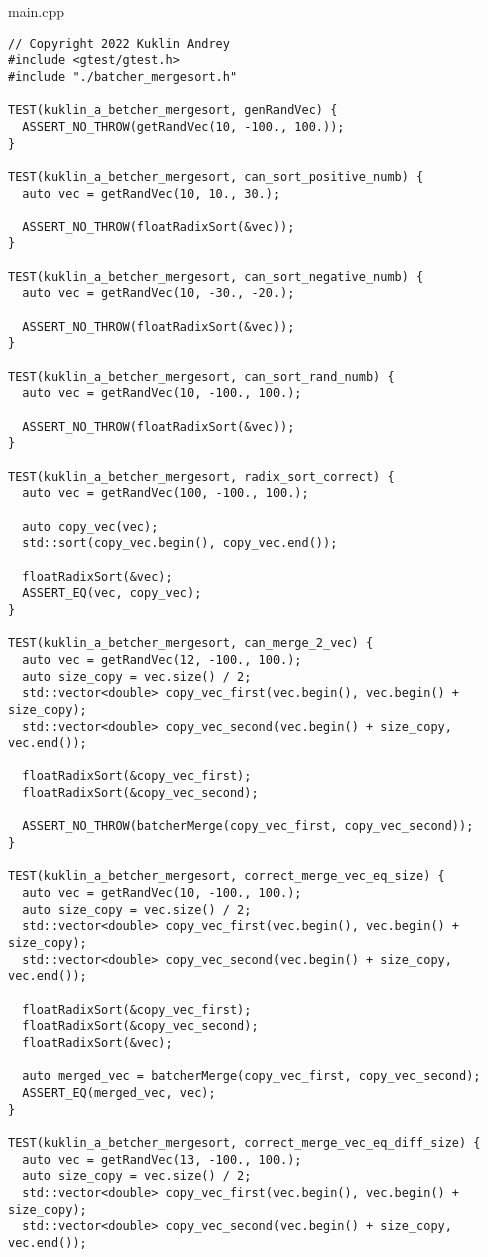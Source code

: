 \documentclass{report}
\begin{document}
\par main.cpp
\begin{lstlisting}
// Copyright 2022 Kuklin Andrey
#include <gtest/gtest.h>
#include "./batcher_mergesort.h"

TEST(kuklin_a_betcher_mergesort, genRandVec) {
  ASSERT_NO_THROW(getRandVec(10, -100., 100.));
}

TEST(kuklin_a_betcher_mergesort, can_sort_positive_numb) {
  auto vec = getRandVec(10, 10., 30.);

  ASSERT_NO_THROW(floatRadixSort(&vec));
}

TEST(kuklin_a_betcher_mergesort, can_sort_negative_numb) {
  auto vec = getRandVec(10, -30., -20.);

  ASSERT_NO_THROW(floatRadixSort(&vec));
}

TEST(kuklin_a_betcher_mergesort, can_sort_rand_numb) {
  auto vec = getRandVec(10, -100., 100.);

  ASSERT_NO_THROW(floatRadixSort(&vec));
}

TEST(kuklin_a_betcher_mergesort, radix_sort_correct) {
  auto vec = getRandVec(100, -100., 100.);

  auto copy_vec(vec);
  std::sort(copy_vec.begin(), copy_vec.end());

  floatRadixSort(&vec);
  ASSERT_EQ(vec, copy_vec);
}

TEST(kuklin_a_betcher_mergesort, can_merge_2_vec) {
  auto vec = getRandVec(12, -100., 100.);
  auto size_copy = vec.size() / 2;
  std::vector<double> copy_vec_first(vec.begin(), vec.begin() + size_copy);
  std::vector<double> copy_vec_second(vec.begin() + size_copy, vec.end());

  floatRadixSort(&copy_vec_first);
  floatRadixSort(&copy_vec_second);

  ASSERT_NO_THROW(batcherMerge(copy_vec_first, copy_vec_second));
}

TEST(kuklin_a_betcher_mergesort, correct_merge_vec_eq_size) {
  auto vec = getRandVec(10, -100., 100.);
  auto size_copy = vec.size() / 2;
  std::vector<double> copy_vec_first(vec.begin(), vec.begin() + size_copy);
  std::vector<double> copy_vec_second(vec.begin() + size_copy, vec.end());

  floatRadixSort(&copy_vec_first);
  floatRadixSort(&copy_vec_second);
  floatRadixSort(&vec);

  auto merged_vec = batcherMerge(copy_vec_first, copy_vec_second);
  ASSERT_EQ(merged_vec, vec);
}

TEST(kuklin_a_betcher_mergesort, correct_merge_vec_eq_diff_size) {
  auto vec = getRandVec(13, -100., 100.);
  auto size_copy = vec.size() / 2;
  std::vector<double> copy_vec_first(vec.begin(), vec.begin() + size_copy);
  std::vector<double> copy_vec_second(vec.begin() + size_copy, vec.end());


\end{lstlisting}
\end{document}
